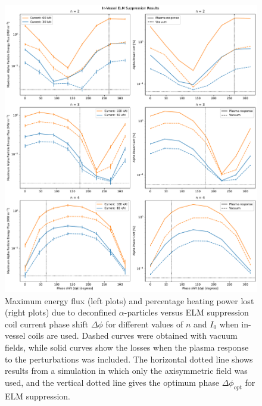 \documentclass[10pt, a4paper, twoside]{article}
\begin{document}
\begin{figure}[htpb]
    \centering
    \vspace{-1cm}
    \includegraphics[width=0.99\linewidth]{Figures/max_and_total_flux_vs_phase_interior_rmp.pdf}
    \caption{Maximum energy flux (left plots) and percentage heating power lost (right plots) due to deconfined $\alpha$-particles versus ELM suppression coil current phase shift $\Delta\phi$ for different values of $n$ and $I_0$ when in-vessel coils are used. Dashed curves were obtained with vacuum fields, while solid curves show the losses when the plasma response to the perturbations was included. The horizontal dotted line shows results from a simulation in which only the axisymmetric field was used, and the vertical dotted line gives the optimum phase $\Delta \phi_{opt}$ for ELM suppression.}
    \vspace{-2cm}
    \label{fig:max_and_total_flux_vs_phase_elm_rwm}
\end{figure}
\end{document}
